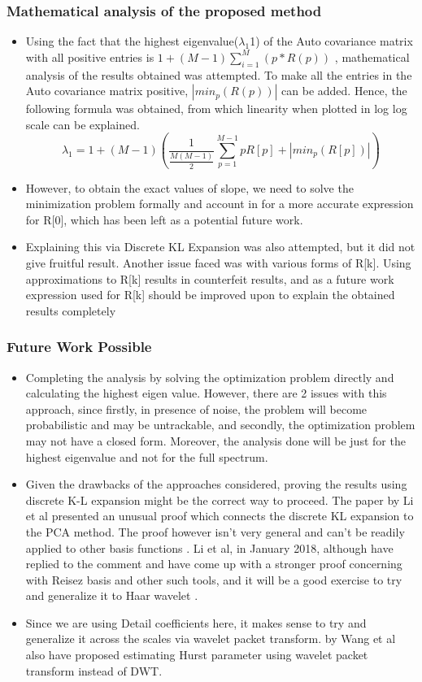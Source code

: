 \documentclass[a4paper]{article}
\begin{document}
\pagebreak
\subsubsection{Mathematical analysis of the proposed method}
\begin{itemize}
\item Using the fact that the highest eigenvalue($\lambda_1$1) of the Auto covariance matrix with all positive entries is $1+(M-1)\sum_{i=1}^M(p*R(p))$ \cite{Eigen}, mathematical analysis of the results obtained was attempted. To make all the entries in the Auto covariance matrix positive,  $|min_p(R(p))|$ can be added. Hence, the following formula was obtained, from which linearity when plotted in log log scale can be explained.​
$$\lambda_1 = 1+(M-1)(\frac{1}{\frac{M(M-1)}{2}}\sum_{p=1}^{M-1}pR[p]+|min_{p}(R[p])|)$$
\item However, to obtain the exact values of slope, we need to solve the minimization problem formally and account in for a more accurate expression for R[0], which has been left as a potential future work.​
\item Explaining this via Discrete KL Expansion was also attempted, but it did not give fruitful result. Another issue faced was with various forms of R[k]. Using approximations to R[k] results in counterfeit results, and as a future work expression used for R[k] should be improved upon to explain the obtained results completely​
\end{itemize}
\subsubsection{Future Work Possible}
\begin{itemize}
	\item Completing the analysis by solving the optimization problem directly and calculating the highest eigen value. However, there are 2 issues with this approach, since firstly, in presence of noise, the problem will become probabilistic and may be untrackable, and secondly, the optimization problem may not have a closed form. Moreover, the analysis done will be just for the highest eigenvalue and not for the full spectrum.
	\item Given the drawbacks of the approaches considered, proving the results using discrete K-L expansion might be the correct way to proceed. The paper by Li et al \cite{DBLP:journals/tsp/LiHCZ09} presented an unusual proof which connects the discrete KL expansion to the PCA method. The proof however isn't very general and can't be readily applied to other basis functions \cite{5447734}. Li et al, in January 2018, although have replied to the comment and have come up with a stronger proof concerning with Reisez basis and other such tools, and it will be a good exercise to try and generalize it to Haar wavelet \cite{response}.
	\item Since we are using Detail coefficients here, it makes sense to try and generalize it across the scales via wavelet packet transform. \cite{4127049} by Wang et al also have proposed estimating Hurst parameter using wavelet packet transform instead of DWT. 
\end{itemize}
\end{document}
